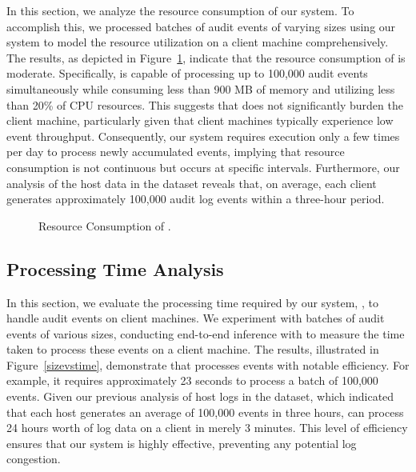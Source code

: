 In this section, we analyze the resource consumption of our system. To accomplish this, we processed batches of audit events of varying sizes using our system to model the resource utilization on a client machine comprehensively. The results, as depicted in Figure~\ref{fig:resource}, indicate that the resource consumption of \Sys is moderate. Specifically, \Sys is capable of processing up to 100,000 audit events simultaneously while consuming less than 900 MB of memory and utilizing less than 20\% of CPU resources. This suggests that \Sys does not significantly burden the client machine, particularly given that client machines typically experience low event throughput. Consequently, our system requires execution only a few times per day to process newly accumulated events, implying that resource consumption is not continuous but occurs at specific intervals. Furthermore, our analysis of the host data in the \optc dataset reveals that, on average, each client generates approximately 100,000 audit log events within a three-hour period.

 \begin{figure}[t!]
  \centering
  \hfill
  \hfill
  \caption{Resource Consumption of \Sys. }
  \label{fig:resource}
  \vspace{-2ex}
\end{figure}

 \subsection{Processing Time Analysis}

 In this section, we evaluate the processing time required by our system, \Sys, to handle audit events on client machines. We experiment with batches of audit events of various sizes, conducting end-to-end inference with \Sys to measure the time taken to process these events on a client machine. The results, illustrated in Figure~\ref{sizevstime}, demonstrate that \Sys processes events with notable efficiency. For example, it requires approximately 23 seconds to process a batch of 100,000 events. Given our previous analysis of host logs in the \optc dataset, which indicated that each host generates an average of 100,000 events in three hours, \Sys can process 24 hours worth of log data on a client in merely 3 minutes. This level of efficiency ensures that our system is highly effective, preventing any potential log congestion.

